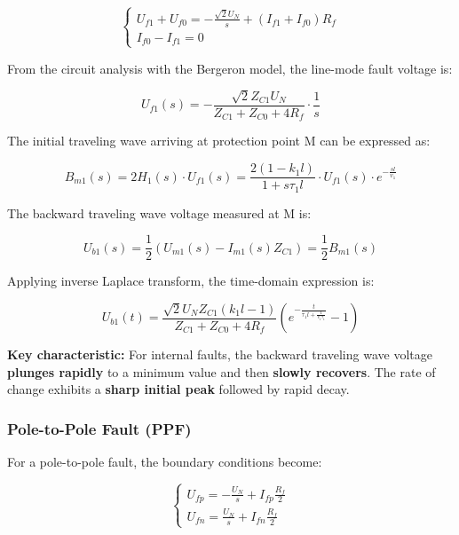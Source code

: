 \documentclass[journal]{IEEEtran}
\begin{document}
\begin{equation}
\begin{cases}
U_{f1} + U_{f0} = -\frac{\sqrt{2}U_N}{s} + (I_{f1} + I_{f0})R_f \\
I_{f0} - I_{f1} = 0
\end{cases}
\end{equation}

From the circuit analysis with the Bergeron model, the line-mode fault voltage is:

\begin{equation}
U_{f1}(s) = -\frac{\sqrt{2}Z_{C1}U_N}{Z_{C1} + Z_{C0} + 4R_f} \cdot \frac{1}{s}
\end{equation}

The initial traveling wave arriving at protection point M can be expressed as:

\begin{equation}
B_{m1}(s) = 2H_1(s) \cdot U_{f1}(s) = \frac{2(1 - k_1l)}{1 + s\tau_1 l} \cdot U_{f1}(s) \cdot e^{-\frac{sl}{v_1}}
\end{equation}

The backward traveling wave voltage measured at M is:

\begin{equation}
U_{b1}(s) = \frac{1}{2}(U_{m1}(s) - I_{m1}(s)Z_{C1}) = \frac{1}{2}B_{m1}(s)
\end{equation}

Applying inverse Laplace transform, the time-domain expression is:

\begin{equation}
U_{b1}(t) = \frac{\sqrt{2}U_NZ_{C1}(k_1l - 1)}{Z_{C1} + Z_{C0} + 4R_f} \left(e^{-\frac{t}{\tau_1 l + \frac{1}{v_1\tau_1}}} - 1\right)
\end{equation}

\textbf{Key characteristic:} For internal faults, the backward traveling wave voltage \textbf{plunges rapidly} to a minimum value and then \textbf{slowly recovers}. The rate of change exhibits a \textbf{sharp initial peak} followed by rapid decay.

\subsubsection{Pole-to-Pole Fault (PPF)}

For a pole-to-pole fault, the boundary conditions become:

\begin{equation}
\begin{cases}
U_{fp} = -\frac{U_N}{s} + I_{fp}\frac{R_f}{2} \\
U_{fn} = \frac{U_N}{s} + I_{fn}\frac{R_f}{2}
\end{cases}
\end{equation}
\end{document}
